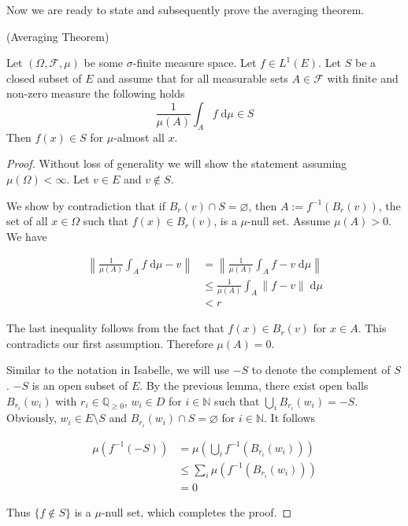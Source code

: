 Now we are ready to state and subsequently prove the averaging theorem.

\begin{theorem} (Averaging Theorem) \par
Let $(\Omega, \mathcal{F}, \mu)$ be some $\sigma$-finite measure space. Let $f \in L^1(E)$. Let $S$ be a closed subset of $E$ and assume that for all measurable sets $A \in \mathcal{F}$ with finite and non-zero measure the following holds
\[
	\frac{1}{\mu(A)}\int_A f \;\textrm{d}\mu \in S
\]
Then $f(x) \in S$ for $\mu$-almost all $x$.
\end{theorem}
\begin{proof}
Without loss of generality we will show the statement assuming $\mu(\Omega) < \infty$. Let $v \in E$ and $v \notin S$. 

We show by contradiction that if $B_r(v) \cap S = \varnothing$,  then $A := f^{-1}(B_r(v))$, the set of all $x \in \Omega$ such that $f(x) \in B_r(v)$, is a $\mu$-null set. Assume $\mu(A) > 0$. We have

\begin{align*}
	\left\lVert \frac{1}{\mu(A)}\int_A f \;\textrm{d}\mu  - v \right\rVert &= \left\lVert \frac{1}{\mu(A)}\int_A f - v \;\textrm{d}\mu \right\rVert \\
	&\le \frac{1}{\mu(A)}\int_A \lVert f - v \rVert \;\textrm{d}\mu \\
	&< r
\end{align*}

The last inequality follows from the fact that $f(x) \in B_r(v)$ for $x \in A$. This contradicts our first assumption. Therefore $\mu(A) = 0$.

Similar to the notation in Isabelle, we will use $-S$ to denote the complement of $S$. $- S$ is an open subset of $E$. By the previous lemma, there exist open balls $B_{r_i}(w_i)$ with $r_i \in \mathbb{Q}_{\ge 0}$, $w_i \in D$ for $i \in \mathbb{N}$ such that $\bigcup_i B_{r_i}(w_i) = - S$. Obviously, $w_i \in E \setminus S$ and $B_{r_i}(w_i) \cap S = \varnothing$ for $i \in \mathbb{N}$. It follows

\begin{align*}
	\mu(f^{-1}(- S)) &= \mu\left(\bigcup_i f^{-1}(B_{r_i}(w_i))\right) \\
	&\le \sum_i \mu(f^{-1}(B_{r_i}(w_i))) \\
	&= 0
\end{align*}

Thus $\{f \notin S \}$ is a $\mu$-null set, which completes the proof.

\end{proof}

